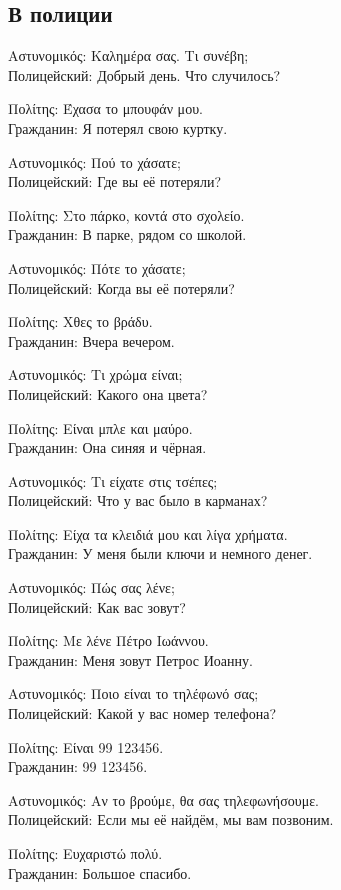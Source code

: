 \documentclass[12pt]{article}
\newcommand{\my}[1]{\textcolor{gray!80!white}{#1}}
\newenvironment{page}{\clearpage\normalsize\null\vfill}{\vfill\null}
\newenvironment{textblock}{\begin{minipage}{\textwidth}}{\end{minipage}\smallskip}
\newcommand{\dialogright}[2]{%
	\par\begingroup\raggedleft
	#1\\
	\my{#2}\par
	\endgroup
}
\begin{document}
	\begin{page}
		\subsection{В полиции}
		\scriptsize
		\begin{textblock}
			Αστυνομικός: Καλημέρα σας. Τι συνέβη;\\
			\my{Полицейский: Добрый день. Что случилось?}
			
			\dialogright{Πολίτης: Έχασα το μπουφάν μου.}{Гражданин: Я потерял свою куртку.}
			
			Αστυνομικός: Πού το χάσατε;\\
			\my{Полицейский: Где вы её потеряли?}
			
			\dialogright{Πολίτης: Στο πάρκο, κοντά στο σχολείο.}{Гражданин: В парке, рядом со школой.}
			
			Αστυνομικός: Πότε το χάσατε;\\
			\my{Полицейский: Когда вы её потеряли?}
			
			\dialogright{Πολίτης: Χθες το βράδυ.}{Гражданин: Вчера вечером.}
			
			Αστυνομικός: Τι χρώμα είναι;\\
			\my{Полицейский: Какого она цвета?}
			
			\dialogright{Πολίτης: Είναι μπλε και μαύρο.}{Гражданин: Она синяя и чёрная.}
			
			Αστυνομικός: Τι είχατε στις τσέπες;\\
			\my{Полицейский: Что у вас было в карманах?}
			
			\dialogright{Πολίτης: Είχα τα κλειδιά μου και λίγα χρήματα.}{Гражданин: У меня были ключи и немного денег.}
			
			Αστυνομικός: Πώς σας λένε;\\
			\my{Полицейский: Как вас зовут?}
			
			\dialogright{Πολίτης: Με λένε Πέτρο Ιωάννου.}{Гражданин: Меня зовут Петрос Иоанну.}
			
			Αστυνομικός: Ποιο είναι το τηλέφωνό σας;\\
			\my{Полицейский: Какой у вас номер телефона?}
			
			\dialogright{Πολίτης: Είναι 99 123456.}{Гражданин: 99 123456.}
			
			Αστυνομικός: Αν το βρούμε, θα σας τηλεφωνήσουμε.\\
			\my{Полицейский: Если мы её найдём, мы вам позвоним.}
			
			\dialogright{Πολίτης: Ευχαριστώ πολύ.}{Гражданин: Большое спасибо.}
		\end{textblock}
	\end{page}
\end{document}
